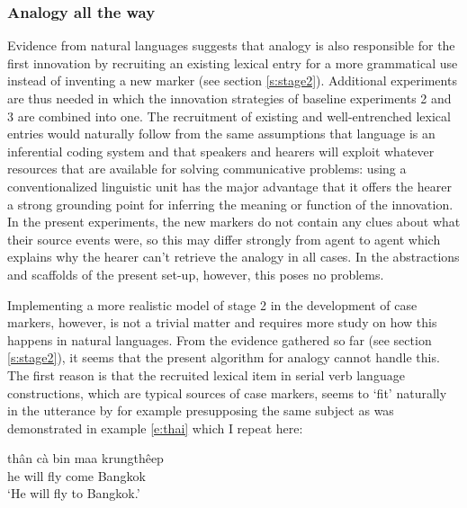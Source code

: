 \subsubsection{Analogy all the way}
 Evidence from natural languages suggests that analogy is also responsible for the first innovation by recruiting an existing lexical entry for a more grammatical use instead of inventing a new marker (see section \ref{s:stage2}). Additional experiments are thus needed in which the innovation strategies of baseline experiments 2 and 3 are combined into one. The recruitment of existing and well-entrenched lexical entries would naturally follow from the same assumptions that language is an inferential coding system and that speakers and hearers will exploit whatever resources that are available for solving communicative problems: using a conventionalized linguistic unit has the major advantage that it offers the hearer a strong grounding point for inferring the meaning or function of the innovation. In the present experiments, the new markers do not contain any clues about what their source events were, so this may differ strongly from agent to agent which explains why the hearer can't retrieve the analogy in all cases. In the abstractions and scaffolds of the present set-up, however, this poses no problems.

Implementing a more realistic model of stage 2 in the development of case markers, however, is not a trivial matter and requires more study on how this happens in natural languages. From the evidence gathered so far (see section \ref{s:stage2}), it seems that the present algorithm for analogy cannot handle this. The first reason is that the recruited lexical item in serial verb language constructions, which are typical sources of case markers, seems to `fit' naturally in the utterance by for example presupposing the same subject as was demonstrated in example \ref{e:thai} which I repeat here: 

\ea
\gll th\^{a}n c\`{a} bin maa krungth\^{e}ep \\
he will fly come Bangkok \\
\glt `He will fly to Bangkok.' \\
\citep[163]{blake94case}
\z



